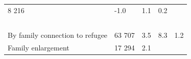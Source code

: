 \documentclass[
]{article}
\begin{document}
\begin{longtable}[]{@{}lllll@{}}
\begin{minipage}[t]{0.17\columnwidth}
8 216\strut
\end{minipage} & \begin{minipage}[t]{0.17\columnwidth}\raggedright
-1.0\strut
\end{minipage} & \begin{minipage}[t]{0.17\columnwidth}\raggedright
1.1\strut
\end{minipage} & \begin{minipage}[t]{0.17\columnwidth}\raggedright
0.2\strut
\end{minipage}\tabularnewline
\begin{minipage}[t]{0.17\columnwidth}\raggedright
~\strut
\end{minipage} & \begin{minipage}[t]{0.17\columnwidth}\raggedright
~\strut
\end{minipage} & \begin{minipage}[t]{0.17\columnwidth}\raggedright
~\strut
\end{minipage} & \begin{minipage}[t]{0.17\columnwidth}\raggedright
~\strut
\end{minipage} & \begin{minipage}[t]{0.17\columnwidth}\raggedright
~\strut
\end{minipage}\tabularnewline
\begin{minipage}[t]{0.17\columnwidth}\raggedright
By family
connection
to refugee\strut
\end{minipage} & \begin{minipage}[t]{0.17\columnwidth}\raggedright
63 707\strut
\end{minipage} & \begin{minipage}[t]{0.17\columnwidth}\raggedright
3.5\strut
\end{minipage} & \begin{minipage}[t]{0.17\columnwidth}\raggedright
8.3\strut
\end{minipage} & \begin{minipage}[t]{0.17\columnwidth}\raggedright
1.2\strut
\end{minipage}\tabularnewline
\begin{minipage}[t]{0.17\columnwidth}\raggedright
Family
enlargement\strut
\end{minipage} & \begin{minipage}[t]{0.17\columnwidth}\raggedright
17 294\strut
\end{minipage} & \begin{minipage}[t]{0.17\columnwidth}\raggedright
2.1\strut

\end{minipage}
\end{longtable}
\end{document}

